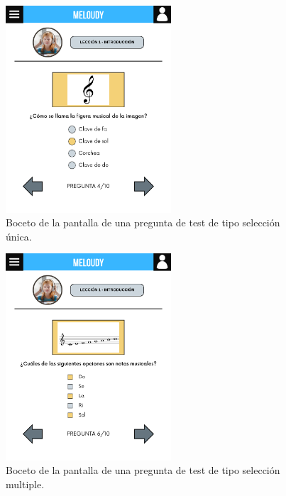 \begin{figure}[H]
    \centering
    \centerline{\includegraphics[width=0.55\textwidth, frame]{imagenes/c6/5.png}}
    \caption{Boceto de la pantalla de una pregunta de test de tipo selección única.}
    \label{fig:seleccionunica}
\end{figure}

\begin{figure}[H]
    \centering
    \centerline{\includegraphics[width=0.55\textwidth, frame]{imagenes/c6/6.png}}
    \caption{Boceto de la pantalla de una pregunta de test de tipo selección multiple.}
    \label{fig:seleccionmultiple}
\end{figure}

